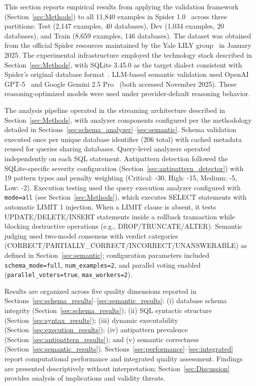 \documentclass[]{einformatica}
\begin{document}
This section reports empirical results from applying the validation framework (Section~\ref{sec:Methods}) to all 11,840 examples in Spider 1.0~\cite{yu2018spider} across three partitions: Test (2,147 examples, 40 databases), Dev (1,034 examples, 20 databases), and Train (8,659 examples, 146 databases). The dataset was obtained from the official Spider resources maintained by the Yale LILY group~\cite{spiderLeaderboard} in January 2025. The experimental infrastructure employed the technology stack described in Section~\ref{sec:Methods}, with SQLite 3.45.0 as the target dialect consistent with Spider's original database format~\cite{yu2018spider,sqliteForeignKeys}. LLM-based semantic validation used OpenAI GPT-5~\cite{openaiModelsDocs} and Google Gemini 2.5 Pro~\cite{geminiApiDocs} (both accessed November 2025). These reasoning-optimized models were used under provider-default reasoning behavior.

The analysis pipeline operated in the streaming architecture described in Section~\ref{sec:Methods}, with analyzer components configured per the methodology detailed in Sections~\ref{sec:schema_analyzer}--\ref{sec:semantic}. Schema validation executed once per unique database identifier (206 total) with cached metadata reused for queries sharing databases. Query-level analyzers operated independently on each SQL statement. Antipattern detection followed the SQLite-specific severity configuration (Section~\ref{sec:antipattern_detector}) with 19 pattern types and penalty weighting (Critical: -30, High: -15, Medium: -5, Low: -2). Execution testing used the query execution analyzer configured with \texttt{mode=all} (see Section~\ref{sec:Methods}), which executes SELECT statements with automatic LIMIT 1 injection. When a LIMIT clause is absent, it tests UPDATE/DELETE/INSERT statements inside a rollback transaction while blocking destructive operations (e.g., DROP/\allowbreak TRUNCATE/\allowbreak ALTER). Semantic judging used two-model consensus with verdict categories (CORRECT/\allowbreak PARTIALLY\_CORRECT/\allowbreak INCORRECT/\allowbreak UNANSWERABLE) as defined in Section~\ref{sec:semantic}; configuration parameters included \texttt{schema\_mode=full}, \texttt{num\_examples=2}, and parallel voting enabled (\texttt{parallel\_voters=true}, \texttt{max\_workers=2}).

Results are organized across five quality dimensions reported in Sections~\ref{sec:schema_results}--\ref{sec:semantic_results}: (i) database schema integrity (Section~\ref{sec:schema_results}); (ii) SQL syntactic structure (Section~\ref{sec:syntax_results}); (iii) dynamic executability (Section~\ref{sec:execution_results}); (iv) antipattern prevalence (Section~\ref{sec:antipattern_results}); and (v) semantic correctness (Section~\ref{sec:semantic_results}). Sections~\ref{sec:performance}--\ref{sec:integrated} report computational performance and integrated quality assessment. Findings are presented descriptively without interpretation; Section~\ref{sec:Discussion} provides analysis of implications and validity threats.
\end{document}
